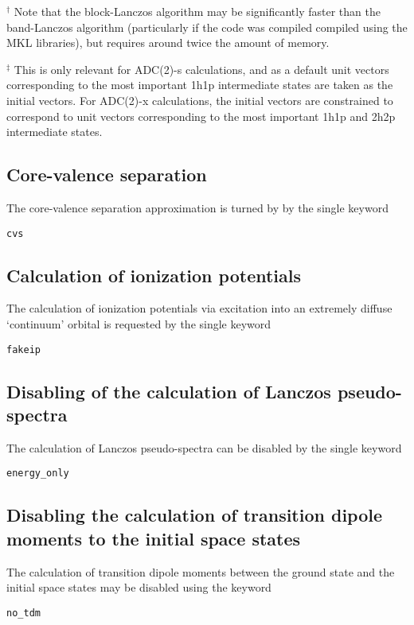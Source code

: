 \documentclass[12pt]{article}
\newcommand*\code[1]{\mbox{\texttt{{#1}}}} %
\begin{document}
\vspace{0.2cm}
\noindent
$^{\dagger}$ Note that the block-Lanczos algorithm may be
significantly faster than the band-Lanczos algorithm (particularly if
the code was compiled compiled using the MKL libraries), but requires
around twice the amount of memory.

\vspace{0.4cm}
\noindent
$^{\ddagger}$ This is only relevant for ADC(2)-s calculations, and as
a default unit vectors corresponding to the most important 1h1p
intermediate states are taken as the initial vectors. For ADC(2)-x
calculations, the initial vectors are constrained to correspond to
unit vectors corresponding to the most important 1h1p and 2h2p
intermediate states.

\subsection*{Core-valence separation}
\noindent
The core-valence separation approximation is turned by by the single
keyword 

\vspace{0.2cm}
\code{cvs}

\subsection*{Calculation of ionization potentials}
\noindent
The calculation of ionization potentials via excitation into an
extremely diffuse `continuum' orbital is requested by the single
keyword

\vspace{0.2cm}
\code{fakeip}

\subsection*{Disabling of the calculation of Lanczos pseudo-spectra}
\noindent
The calculation of Lanczos pseudo-spectra can be disabled by the
single keyword 

\vspace{0.2cm}
\code{energy\_only}

\subsection*{Disabling the calculation of transition dipole moments to
the initial space states}
\noindent
The calculation of transition dipole moments between the ground state
and the initial space states may be disabled using the keyword

\vspace{0.2cm}
\code{no\_tdm}
\end{document}

